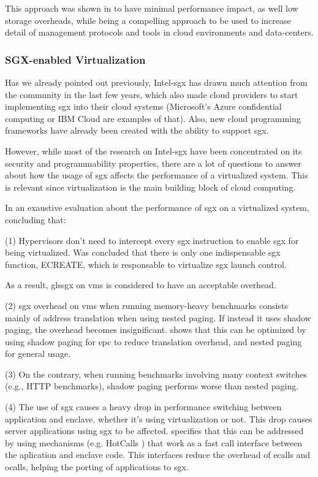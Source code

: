 This approach was shown in \cite{sgxCloudThesis} to have minimal performance impact, as well low storage overheads, while being a compelling approach to be used to increase detail of management protocols and tools in cloud environments and data-centers.


\subsubsection{SGX-enabled Virtualization}

Has we already pointed out previously, Intel-\gls{sgx} has drawn much attention from the community in the last few years, which also made cloud providers to start implementing \gls{sgx} into their cloud systems (Microsoft's Azure confidential computing or IBM Cloud are examples of that). Also, new cloud programming frameworks have already been created with the ability to support \gls{sgx}. 

However, while most of the research on Intel-\gls{sgx} have been concentrated on its security and programmability properties, there are a lot of questions to answer about how the usage of \gls{sgx} affects the performance of a virtualized system. This is relevant since virtualization is the main building block of cloud computing.

In \cite{sgxVirtualizationPaper} an exaustive evaluation about the performance of \gls{sgx} on a virtualized system, concluding that:

(1) Hypervisors don't need to intercept every \gls{sgx} instruction to enable \gls{sgx} for being virtualized. Was concluded that there is only one indispensable \gls{sgx} function, ECREATE, which is responsable to virtualize \gls{sgx} launch control.

As a result, gls{sgx} on \gls{vm}s is considered to have an acceptable overhead.

(2)  \gls{sgx} overhead on \gls{vm}s when running memory-heavy benchmarks consists mainly of address translation when using nested paging. If instead it uses shadow paging, the overhead becomes insignificant. 
\cite{sgxVirtualizationPaper} shows that this can be optimized by using shadow paging for \gls{epc} to reduce translation overhead, and nested paging for general usage.

(3) On the contrary, when running benchmarks involving many context switches (e.g., HTTP benchmarks), shadow paging performs worse than nested paging.

(4) The use of \gls{sgx} causes a heavy drop in performance switching between application and enclave, whether it's using virtualization or not. This drop causes server applications using \gls{sgx} to be affected.
\cite{sgxVirtualizationPaper} specifies that this can be addressed by using mechanisms (e.g. HotCalls \cite{hotcallsPaper}) that work as a fast call interface between the aplication and enclave code. This interfaces reduce the overhead of ecalls and ocalls, helping the porting of applications to \gls{sgx}.

